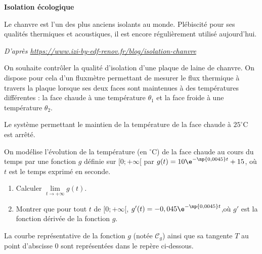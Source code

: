 	\textbf{Isolation écologique}

	Le chanvre est l'un des plus anciens isolants au monde. Plébiscité pour ses qualités thermiques et acoustiques, il est encore régulièrement utilisé aujourd'hui.

	\hfill \emph{D'après \href{https://www.izi-by-edf-renov.fr/blog/isolation-chanvre}{https://www.izi-by-edf-renov.fr/blog/isolation-chanvre}}

	On souhaite contrôler la qualité d'isolation d'une plaque de laine de chanvre. On dispose pour cela d'un fluxmètre permettant de mesurer le flux thermique à travers la plaque lorsque ses deux faces sont maintenues à des températures différentes : la face \og chaude \fg{} à une température $\theta_{1}$ et la face \og froide \fg{} à une température $\theta_{2}$.

	Le système permettant le maintien de la température de la face \og chaude \fg{} à $25^{\circ}\mathrm{C}$ est arrêté.

	\medskip

	On modélise l'évolution de la température (en ${}^{\circ} \mathrm{C}$) de la face \og chaude \fg{} au cours du temps par une fonction $g$ définie sur $[0 ; +\infty[$ par $g(t)=10 \e^{-\np{0,0045} t}+15$, où $t$ est le temps exprimé en seconde.

	\begin{enumerate}[start=5]
		\item Calculer $\lim\limits_{t \to +\infty} g(t)$.

		\item Montrer que pour tout $t$ de $[0 ; +\infty[$, \quad$ g'(t)=-0,045 \e^{-\np{0,0045} t}$,\quad où $g'$ est la fonction dérivée de la fonction $g$.
	\end{enumerate}


		La courbe représentative de la fonction $g$ (notée $\mathcal{C}_{g}$) ainsi que sa tangente $T$ au point d'abscisse 0 sont représentées dans le repère ci-dessous.

		\begin{center}
		\end{center}


